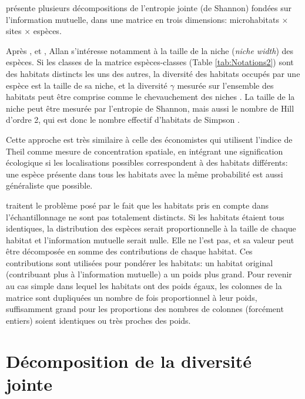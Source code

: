 \documentclass[
  11pt,
  french,
  a4paper,
  extrafontsizes,onecolumn,openright
  ]{memoir}
\begin{document}
\textcite{Allan1975} présente plusieurs décompositions de l'entropie jointe (de Shannon) fondées sur l'information mutuelle, dans une matrice en trois dimensions: microhabitats \(\times\) sites \(\times\) espèces.

Après \textcite{Levins1968}, \textcite{Colwell1971} et \textcite{Pielou1972}, Allan s'intéresse notamment à la taille de la niche (\emph{niche width}) des espèces.
Si les classes de la matrice espèces-classes (Table \ref{tab:Notations2}) sont des habitats distincts les uns des autres, la diversité des habitats occupés par une espèce est la taille de sa niche, et la diversité \(\gamma\) mesurée sur l'ensemble des habitats peut être comprise comme le chevauchement des niches \autocite{Pielou1972}.
La taille de la niche peut être mesurée par l'entropie de Shannon, mais aussi le nombre de Hill d'ordre 2, qui est donc le nombre effectif d'habitats de Simpson \autocite{Levins1968}.

Cette approche est très similaire à celle des économistes qui utilisent l'indice de Theil comme mesure de concentration spatiale, en intégrant une signification écologique si les localisations possibles correspondent à des habitats différents: une espèce présente dans tous les habitats avec la même probabilité est aussi généraliste que possible.

\textcite{Colwell1971} traitent le problème posé par le fait que les habitats pris en compte dans l'échantillonnage ne sont pas totalement distincts.
Si les habitats étaient tous identiques, la distribution des espèces serait proportionnelle à la taille de chaque habitat et l'information mutuelle serait nulle.
Elle ne l'est pas, et sa valeur peut être décomposée en somme des contributions de chaque habitat.
Ces contributions sont utilisées pour pondérer les habitats: un habitat original (contribuant plus à l'information mutuelle) a un poids plus grand.
Pour revenir au cas simple dans lequel les habitats ont des poids égaux, les colonnes de la matrice sont dupliquées un nombre de fois proportionnel à leur poids, suffisamment grand pour les proportions des nombres de colonnes (forcément entiers) soient identiques ou très proches des poids.

\hypertarget{chap:DiversiteJointe}{%
\chapter{Décomposition de la diversité jointe}\label{chap:DiversiteJointe}}

\scriptsize
\end{document}
